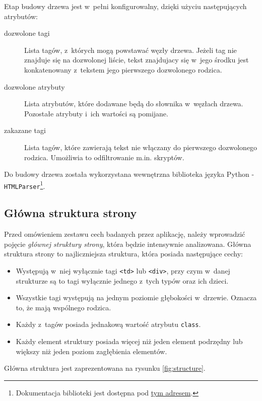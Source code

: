 \documentclass[a4paper,11pt]{article}
\begin{document}
Etap budowy drzewa jest w~pełni konfigurowalny, dzięki użyciu następujących atrybutów:

\begin{description}
    \item[dozwolone tagi] Lista tagów, z~których mogą powstawać węzły drzewa. Jeżeli tag nie znajduje się na dozwolonej liście, tekst znajdujacy się w~jego środku jest konkatenowany z~tekstem jego pierwszego dozwolonego rodzica.
    \item[dozwolone atrybuty] Lista atrybutów, które dodawane będą do słownika w~węzłach drzewa. Pozostałe atrybuty i~ich wartości są pomijane.
    \item[zakazane tagi] Lista tagów, które zawierają tekst nie włączany do pierwszego dozwolonego rodzica. Umożliwia to odfiltrowanie m.in. skryptów.
\end{description}

Do budowy drzewa została wykorzystana wewnętrzna biblioteka języka Python - \verb+HTMLParser+\footnote{Dokumentacja biblioteki jest dostępna pod \href{http://docs.python.org/2/library/htmlparser.html}{tym adresem}.}.

\subsection{Główna struktura strony}
\label{sec:main_structure}

Przed omówieniem zestawu cech badanych przez aplikację, należy wprowadzić pojęcie \emph{głównej struktury strony}, która będzie intensywnie analizowana. Główna struktura strony to najliczniejsza struktura, która posiada następujące cechy:

\begin{itemize}
    \item Występują w~niej wyłącznie tagi \verb+<td>+ lub \verb+<div>+, przy czym w~danej strukturze są to tagi wyłącznie jednego z~tych typów oraz ich dzieci.
    \item Wszystkie tagi występują na jednym poziomie głębokości w~drzewie. Oznacza to, że mają wspólnego rodzica.
    \item Każdy z~tagów posiada jednakową wartość atrybutu \verb+class+.
    \item Każdy element struktury posiada więcej niż jeden element podrzędny lub większy niż jeden poziom zagłębienia elementów.
\end{itemize}

Główna struktura jest zaprezentowana na rysunku \ref{fig:structure}.
\end{document}
